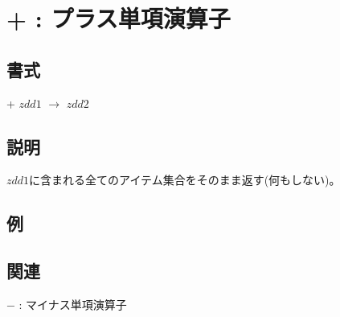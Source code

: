 
\section{+ : プラス単項演算子\label{sect:plus_op}}
\subsection*{書式}
+ $zdd1$ $\rightarrow$ $zdd2$

\subsection*{説明}
$zdd1$に含まれる全てのアイテム集合をそのまま返す(何もしない)。

\subsection*{例}


\subsection*{関連}
\hyperref[sect:minus_op]{$-$} : マイナス単項演算子
